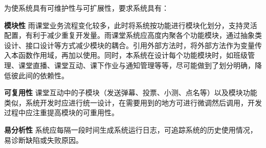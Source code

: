 为使系统具有可维护性与可扩展性，要求系统具有：

\textbf{模块性}
雨课堂业务流程变化较多，此时将系统按功能进行模块化划分，支持灵活配置，有利于减少重复开发量。雨课堂系统应高度内聚各个功能模块，通过抽象类设计、接口设计等方式减少模块的耦合。引用外部方法时，将外部方法作为变量传入本函数作用域，再加以使用。同时，本系统在设计每个功能模块时，如班级管理、课堂直播、课堂互动、课下作业与通知管理等等，尽可能做到了划分明确，降低彼此间的依赖性。

\textbf{可复用性}
课堂互动中的子模块（发送弹幕、投票、小测、点名等）以及模块功能类似，系统开发时应进行统一设计，在需要用到的地方可进行微调然后调用，开发过程中应注重提高模块的可重用性。

\textbf{易分析性}
系统应每隔一段时间生成系统运行日志，可追踪系统的历史使用情况，易诊断缺陷或失败原因。
